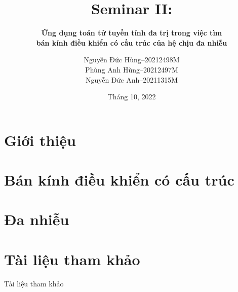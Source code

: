 \documentclass[aspectratio=169]{beamer}
\title{Seminar II:}
\subtitle{\textbf{Ứng dụng toán tử tuyến tính đa trị trong việc tìm\\bán kính điều khiển có cấu trúc của hệ chịu đa nhiễu}}
\author{Nguyễn Đức Hùng--20212498M\\Phùng Anh Hùng--20212497M\\Nguyễn Đức Anh--20211315M}
\date{Tháng 10, 2022}
\begin{document}
\begin{frame}
	\maketitle
\end{frame}

\section{Giới thiệu}


\section{Bán kính điều khiển có cấu trúc}

\section{Đa nhiễu}



\section{Tài liệu tham khảo}
\begin{frame}{Tài liệu tham khảo}
    \nocite{*}
    
    
\end{frame}

\begin{frame}{~}
    \Large \color{hustred}{Cảm ơn mọi người đã chú ý lắng nghe!}
\end{frame}
\end{document}
